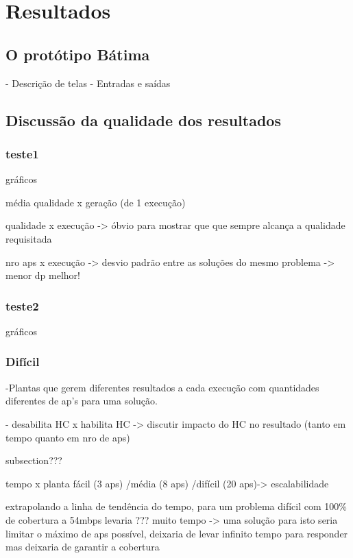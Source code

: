 \documentclass[tc,twoside]{iiufrgs}
\begin{document}
	
\chapter{Resultados} 

\section{O protótipo Bátima}

- Descrição de telas
- Entradas e saídas

\section{Discussão da qualidade dos resultados}

\subsection{teste1}

gráficos

média qualidade x geração (de 1 execução)

qualidade x execução -> óbvio para mostrar que que sempre alcança a qualidade requisitada

nro aps x execução -> desvio padrão entre as soluções do mesmo problema -> menor dp melhor!

\subsection{teste2}

gráficos

\subsection{Difícil}

-Plantas que gerem diferentes resultados a cada execução com quantidades diferentes de ap's para uma solução.

- desabilita HC x habilita HC -> discutir impacto do HC no resultado (tanto em tempo quanto em nro de aps)

subsection{???}

tempo x planta fácil (3 aps) /média (8 aps) /difícil (20 aps)-> escalabilidade

extrapolando a linha de tendência do tempo, para um problema difícil com 100\% de cobertura a 54mbps levaria ??? muito tempo -> uma solução para isto seria limitar o máximo de aps possível, deixaria de levar infinito tempo para responder mas deixaria de garantir a cobertura
\end{document}

